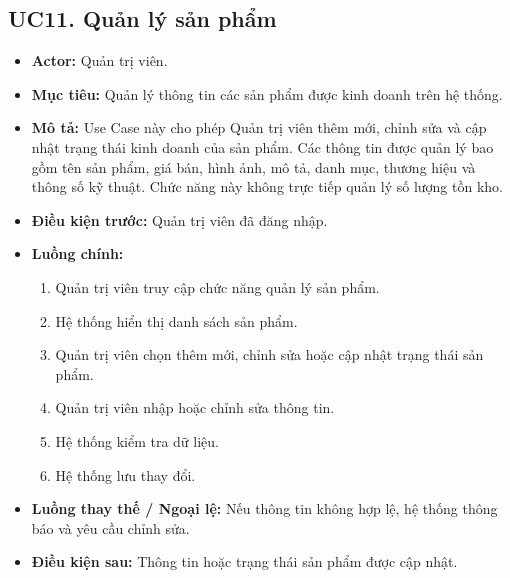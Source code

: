 \documentclass[12pt,a4paper]{article}
\begin{document}

\subsection*{UC11. Quản lý sản phẩm}

\begin{itemize}

 \item \textbf{Actor:} Quản trị viên.

 \item \textbf{Mục tiêu:} Quản lý thông tin các sản phẩm được kinh doanh trên hệ thống.

 \item \textbf{Mô tả:} Use Case này cho phép Quản trị viên thêm mới, chỉnh sửa và cập nhật trạng thái kinh doanh của sản phẩm. Các thông tin được quản lý bao gồm tên sản phẩm, giá bán, hình ảnh, mô tả, danh mục, thương hiệu và thông số kỹ thuật. Chức năng này không trực tiếp quản lý số lượng tồn kho.

 \item \textbf{Điều kiện trước:} Quản trị viên đã đăng nhập.

 \item \textbf{Luồng chính:}

 \begin{enumerate}

  \item Quản trị viên truy cập chức năng quản lý sản phẩm.

  \item Hệ thống hiển thị danh sách sản phẩm.

  \item Quản trị viên chọn thêm mới, chỉnh sửa hoặc cập nhật trạng thái sản phẩm.

  \item Quản trị viên nhập hoặc chỉnh sửa thông tin.

  \item Hệ thống kiểm tra dữ liệu.

  \item Hệ thống lưu thay đổi.

 \end{enumerate}

 \item \textbf{Luồng thay thế / Ngoại lệ:} Nếu thông tin không hợp lệ, hệ thống thông báo và yêu cầu chỉnh sửa.

 \item \textbf{Điều kiện sau:} Thông tin hoặc trạng thái sản phẩm được cập nhật.


\end{itemize}
\end{document}
